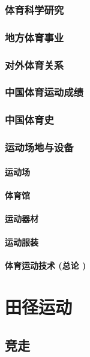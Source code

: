 \documentclass[UTF8]{../../ApplicationUniverse}
\begin{document}
    \subsection{体育科学研究}
    \subsection{地方体育事业}
    \subsection{对外体育关系}
    \subsection{中国体育运动成绩}
    \subsection{中国体育史}

    \subsection{运动场地与设备}
        \subsubsection{运动场}
        \subsubsection{体育馆}
        \subsubsection{运动器材}
        \subsubsection{运动服装}
    \subsubsection{体育运动技术 (总论 )}







\chapter{田径运动}
\section{竞走}
\end{document}

